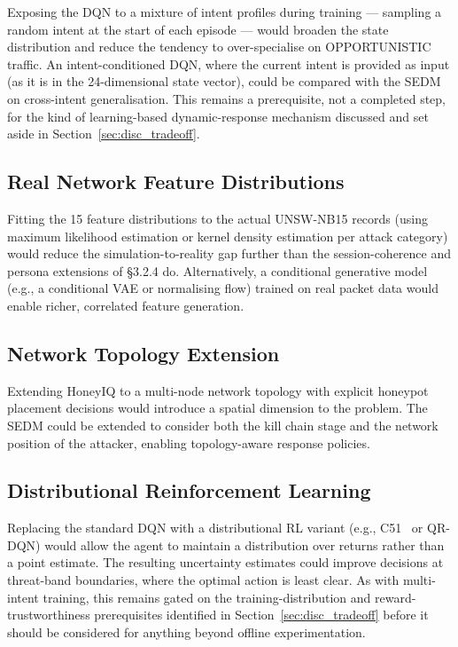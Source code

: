 Exposing the DQN to a mixture of intent profiles during training --- sampling
a random intent at the start of each episode --- would broaden the state
distribution and reduce the tendency to over-specialise on OPPORTUNISTIC
traffic.
An intent-conditioned DQN, where the current intent is provided as input
(as it is in the 24-dimensional state vector), could be compared with the
SEDM on cross-intent generalisation.
This remains a prerequisite, not a completed step, for the kind of
learning-based dynamic-response mechanism discussed and set aside in
Section~\ref{sec:disc_tradeoff}.

\subsection{Real Network Feature Distributions}

Fitting the 15 feature distributions to the actual UNSW-NB15 records
(using maximum likelihood estimation or kernel density estimation per
attack category) would reduce the simulation-to-reality gap further than
the session-coherence and persona extensions of \S3.2.4 do.
Alternatively, a conditional generative model (e.g., a conditional VAE
or normalising flow) trained on real packet data would enable richer,
correlated feature generation.

\subsection{Network Topology Extension}

Extending HoneyIQ to a multi-node network topology with explicit honeypot
placement decisions would introduce a spatial dimension to the problem.
The SEDM could be extended to consider both the kill chain stage and the
network position of the attacker, enabling topology-aware response policies.

\subsection{Distributional Reinforcement Learning}

Replacing the standard DQN with a distributional RL variant
(e.g., C51~\citep{wang2016dueling} or QR-DQN) would allow the agent to
maintain a distribution over returns rather than a point estimate.
The resulting uncertainty estimates could improve decisions at threat-band
boundaries, where the optimal action is least clear.
As with multi-intent training, this remains gated on the
training-distribution and reward-trustworthiness prerequisites identified
in Section~\ref{sec:disc_tradeoff} before it should be considered for
anything beyond offline experimentation.

